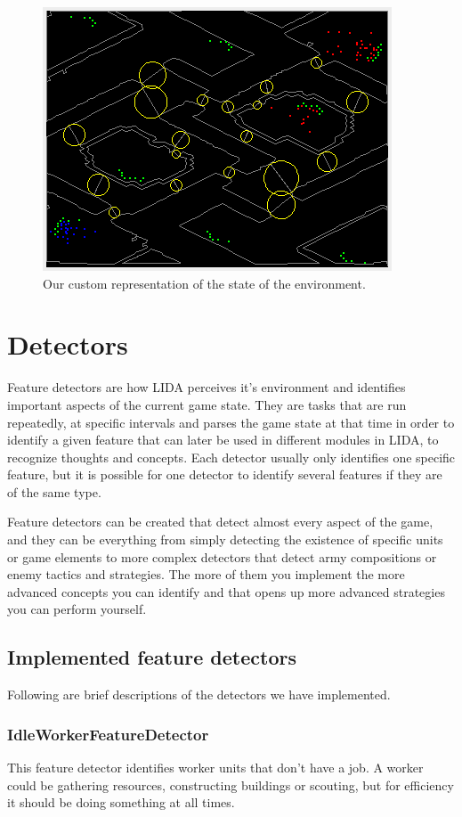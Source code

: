 \begin{figure}[h!tb]
\centering
\includegraphics{graphics/environment-gui.png}
\caption{Our custom representation of the state of the environment.}
\label{fig:environment-gui}
\end{figure}

\section{Detectors}
\label{sec:detectors}
Feature detectors are how LIDA perceives it's environment and identifies important aspects of the current game state. They are tasks that are run repeatedly, at specific intervals and parses the game state at that time in order to identify a given feature that can later be used in different modules in LIDA, to recognize thoughts and concepts. Each detector usually only identifies one specific feature, but it is possible for one detector to identify several features if they are of the same type. 

Feature detectors can be created that detect almost every aspect of the game, and they can be everything from simply detecting the existence of specific units or game elements to more complex detectors that detect army compositions or enemy tactics and strategies. The more of them you implement the more advanced concepts you can identify and that opens up more advanced strategies you can perform yourself. 

\subsection{Implemented feature detectors}
Following are brief descriptions of the detectors we have implemented.

\subsubsection{IdleWorkerFeatureDetector}
This feature detector identifies worker units that don't have a job. A worker could be gathering resources, constructing buildings or scouting, but for efficiency it should be doing something at all times. 

